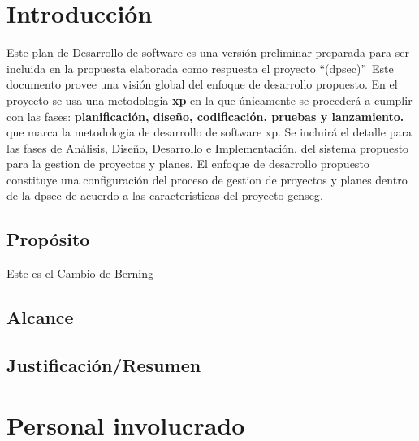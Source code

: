 \documentclass[12pt,a4paper]{article}
\begin{document}


\tableofcontents %
\listoffigures

\listoftables
\pagestyle{fancy} \mystyle \newpage %




\section{Introducción }
Este plan de Desarrollo de software es una versión preliminar preparada para ser incluida 
en la propuesta elaborada como respuesta el proyecto \textquotedblleft(\gls{dpsec})\textquotedblright \ Este documento
provee una visión global del enfoque de desarrollo propuesto.
\espacio
En el proyecto se usa una metodologia \textbf{\gls{xp}} en la que únicamente
se procederá a cumplir con las fases: \textbf{planificación, diseño, codificación, pruebas y lanzamiento.}
que marca la metodologia de desarrollo de software \gls{xp}.
Se incluirá el detalle para las fases de Análisis, Diseño, Desarrollo e Implementación.
del sistema propuesto para la gestion de proyectos y planes.
\espacio
El enfoque de desarrollo propuesto constituye una configuración del proceso
de gestion de proyectos y planes dentro de la \gls{dpsec} de acuerdo a las 
caracteristicas del proyecto \gls{genseg}. 

\subsection{Propósito } 
Este es el Cambio de Berning
\subsection{Alcance}
 
\subsection{Justificación/Resumen}


\section{Personal involucrado}
\end{document}
